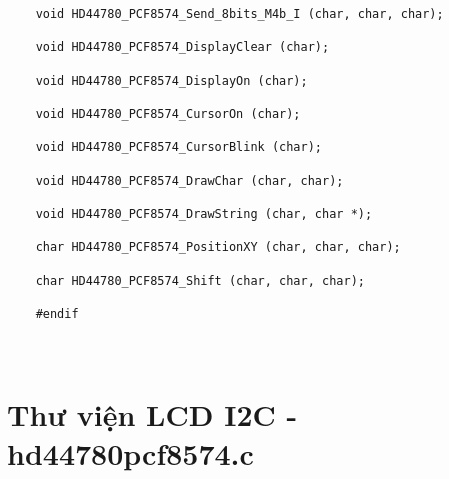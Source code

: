 \begin{lstlisting}
	void HD44780_PCF8574_Send_8bits_M4b_I (char, char, char);
	
	void HD44780_PCF8574_DisplayClear (char);
	
	void HD44780_PCF8574_DisplayOn (char);
	
	void HD44780_PCF8574_CursorOn (char);
	
	void HD44780_PCF8574_CursorBlink (char);

	void HD44780_PCF8574_DrawChar (char, char);
	
	void HD44780_PCF8574_DrawString (char, char *);
	
	char HD44780_PCF8574_PositionXY (char, char, char);
	
	char HD44780_PCF8574_Shift (char, char, char);
	
	#endif
	
	
\end{lstlisting}

\section{Thư viện LCD I2C - hd44780pcf8574.c}

